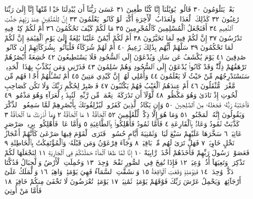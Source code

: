 بَعْضࣲ يَتَلَٰوَمُونَ ٣٠ قَالُوا۟ يَٰوَيْلَنَآ إِنَّا كُنَّا طَٰغِينَ ٣١ عَسَىٰ رَبُّنَآ أَن يُبْدِلَنَا
خَيْرࣰا مِّنْهَآ إِنَّآ إِلَىٰ رَبِّنَا رَٰغِبُونَ ٣٢ كَذَٰلِكَ ٱلْعَذَابُۖ وَلَعَذَابُ ٱلْأٓخِرَةِ
أَكْبَرُۚ لَوْ كَانُوا۟ يَعْلَمُونَ ٣٣ إِنَّ لِلْمُتَّقِينَ عِندَ رَبِّهِمْ جَنَّٰتِ ٱلنَّعِيمِ ٣٤
أَفَنَجْعَلُ ٱلْمُسْلِمِينَ كَٱلْمُجْرِمِينَ ٣٥ مَا لَكُمْ كَيْفَ تَحْكُمُونَ ٣٦ أَمْ لَكُمْ
كِتَٰبࣱ فِيهِ تَدْرُسُونَ ٣٧ إِنَّ لَكُمْ فِيهِ لَمَا تَخَيَّرُونَ ٣٨ أَمْ لَكُمْ أَيْمَٰنٌ عَلَيْنَا
بَٰلِغَةٌ إِلَىٰ يَوْمِ ٱلْقِيَٰمَةِ إِنَّ لَكُمْ لَمَا تَحْكُمُونَ ٣٩ سَلْهُمْ أَيُّهُم بِذَٰلِكَ
زَعِيمٌ ٤٠ أَمْ لَهُمْ شُرَكَآءُ فَلْيَأْتُوا۟ بِشُرَكَآئِهِمْ إِن كَانُوا۟ صَٰدِقِينَ ٤١ يَوْمَ
يُكْشَفُ عَن سَاقࣲ وَيُدْعَوْنَ إِلَى ٱلسُّجُودِ فَلَا يَسْتَطِيعُونَ ٤٢
خَٰشِعَةً أَبْصَٰرُهُمْ تَرْهَقُهُمْ ذِلَّةࣱۖ وَقَدْ كَانُوا۟ يُدْعَوْنَ إِلَى ٱلسُّجُودِ وَهُمْ
سَٰلِمُونَ ٤٣ فَذَرْنِي وَمَن يُكَذِّبُ بِهَٰذَا ٱلْحَدِيثِۖ سَنَسْتَدْرِجُهُم
مِّنْ حَيْثُ لَا يَعْلَمُونَ ٤٤ وَأُمْلِي لَهُمْۚ إِنَّ كَيْدِي مَتِينٌ ٤٥ أَمْ تَسْـَٔلُهُمْ
أَجْرࣰا فَهُم مِّن مَّغْرَمࣲ مُّثْقَلُونَ ٤٦ أَمْ عِندَهُمُ ٱلْغَيْبُ فَهُمْ يَكْتُبُونَ ٤٧
فَٱصْبِرْ لِحُكْمِ رَبِّكَ وَلَا تَكُن كَصَاحِبِ ٱلْحُوتِ إِذْ نَادَىٰ
وَهُوَ مَكْظُومࣱ ٤٨ لَّوْلَآ أَن تَدَٰرَكَهُۥ نِعْمَةࣱ مِّن رَّبِّهِۦ لَنُبِذَ بِٱلْعَرَآءِ
وَهُوَ مَذْمُومࣱ ٤٩ فَٱجْتَبَٰهُ رَبُّهُۥ فَجَعَلَهُۥ مِنَ ٱلصَّٰلِحِينَ ٥٠
وَإِن يَكَادُ ٱلَّذِينَ كَفَرُوا۟ لَيُزْلِقُونَكَ بِأَبْصَٰرِهِمْ لَمَّا سَمِعُوا۟
ٱلذِّكْرَ وَيَقُولُونَ إِنَّهُۥ لَمَجْنُونࣱ ٥١ وَمَا هُوَ إِلَّا ذِكْرࣱ لِّلْعَٰلَمِينَ ٥٢
ٱلْحَآقَّةُ ١ مَا ٱلْحَآقَّةُ ٢ وَمَآ أَدْرَىٰكَ مَا ٱلْحَآقَّةُ ٣ كَذَّبَتْ ثَمُودُ وَعَادُۢ
بِٱلْقَارِعَةِ ٤ فَأَمَّا ثَمُودُ فَأُهْلِكُوا۟ بِٱلطَّاغِيَةِ ٥ وَأَمَّا عَادࣱ فَأُهْلِكُوا۟ بِرِيحࣲ
صَرْصَرٍ عَاتِيَةࣲ ٦ سَخَّرَهَا عَلَيْهِمْ سَبْعَ لَيَالࣲ وَثَمَٰنِيَةَ أَيَّامٍ حُسُومࣰاۖ فَتَرَى
ٱلْقَوْمَ فِيهَا صَرْعَىٰ كَأَنَّهُمْ أَعْجَازُ نَخْلٍ خَاوِيَةࣲ ٧ فَهَلْ تَرَىٰ لَهُم مِّنۢ بَاقِيَةࣲ ٨
وَجَآءَ فِرْعَوْنُ وَمَن قَبْلَهُۥ وَٱلْمُؤْتَفِكَٰتُ بِٱلْخَاطِئَةِ ٩ فَعَصَوْا۟ رَسُولَ
رَبِّهِمْ فَأَخَذَهُمْ أَخْذَةࣰ رَّابِيَةً ١٠ إِنَّا لَمَّا طَغَا ٱلْمَآءُ حَمَلْنَٰكُمْ فِي
ٱلْجَارِيَةِ ١١ لِنَجْعَلَهَا لَكُمْ تَذْكِرَةࣰ وَتَعِيَهَآ أُذُنࣱ وَٰعِيَةࣱ ١٢ فَإِذَا نُفِخَ
فِي ٱلصُّورِ نَفْخَةࣱ وَٰحِدَةࣱ ١٣ وَحُمِلَتِ ٱلْأَرْضُ وَٱلْجِبَالُ فَدُكَّتَا دَكَّةࣰ
وَٰحِدَةࣰ ١٤ فَيَوْمَئِذࣲ وَقَعَتِ ٱلْوَاقِعَةُ ١٥ وَٱنشَقَّتِ ٱلسَّمَآءُ فَهِيَ يَوْمَئِذࣲ
وَاهِيَةࣱ ١٦ وَٱلْمَلَكُ عَلَىٰٓ أَرْجَآئِهَاۚ وَيَحْمِلُ عَرْشَ رَبِّكَ فَوْقَهُمْ يَوْمَئِذࣲ
ثَمَٰنِيَةࣱ ١٧ يَوْمَئِذࣲ تُعْرَضُونَ لَا تَخْفَىٰ مِنكُمْ خَافِيَةࣱ ١٨ فَأَمَّا مَنْ أُوتِيَ
